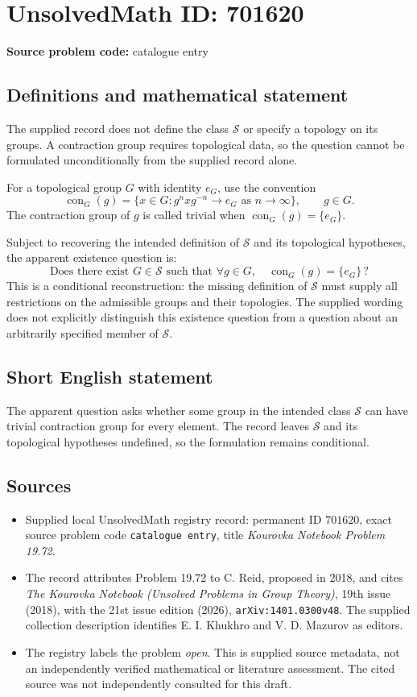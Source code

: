 \documentclass[11pt]{article}
\begin{document}
\section*{UnsolvedMath ID: 701620}
\textbf{Source problem code:} catalogue entry
\subsection{Definitions and mathematical statement}
The supplied record does not define the class \(\mathscr{S}\) or specify a topology on its groups. A contraction group requires topological data, so the question cannot be formulated unconditionally from the supplied record alone.

For a topological group \(G\) with identity \(e_G\), use the convention
\[
\operatorname{con}_G(g)=\{x\in G: g^n x g^{-n}\longrightarrow e_G\text{ as }n\to\infty\},\qquad g\in G.
\]
The contraction group of \(g\) is called trivial when \(\operatorname{con}_G(g)=\{e_G\}\).

Subject to recovering the intended definition of \(\mathscr{S}\) and its topological hypotheses, the apparent existence question is:
\[
\text{Does there exist }G\in\mathscr{S}\text{ such that }
\forall g\in G,\quad \operatorname{con}_G(g)=\{e_G\}\,?
\]
This is a conditional reconstruction: the missing definition of \(\mathscr{S}\) must supply all restrictions on the admissible groups and their topologies. The supplied wording does not explicitly distinguish this existence question from a question about an arbitrarily specified member of \(\mathscr{S}\).
\subsection{Short English statement}
The apparent question asks whether some group in the intended class \(\mathscr{S}\) can have trivial contraction group for every element. The record leaves \(\mathscr{S}\) and its topological hypotheses undefined, so the formulation remains conditional.
\subsection{Sources}
\begin{itemize}
\item Supplied local UnsolvedMath registry record: permanent ID \(701620\), exact source problem code \texttt{catalogue entry}, title \emph{Kourovka Notebook Problem 19.72}.
\item The record attributes Problem 19.72 to C. Reid, proposed in 2018, and cites \emph{The Kourovka Notebook (Unsolved Problems in Group Theory)}, 19th issue (2018), with the 21st issue edition (2026), \texttt{arXiv:1401.0300v48}. The supplied collection description identifies E. I. Khukhro and V. D. Mazurov as editors.
\item The registry labels the problem \emph{open}. This is supplied source metadata, not an independently verified mathematical or literature assessment. The cited source was not independently consulted for this draft.
\end{itemize}
\end{document}
